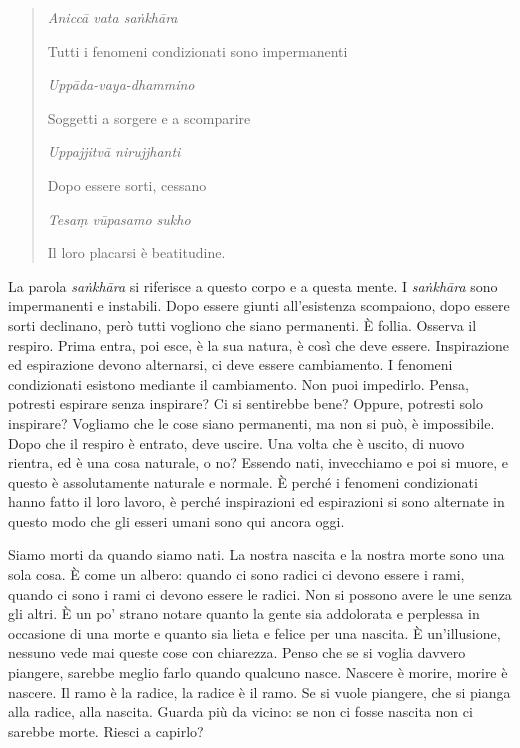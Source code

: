 \begin{quote}

\emph{Aniccā vata saṅkhāra}

Tutti i fenomeni condizionati sono impermanenti

\emph{Uppāda-vaya-dhammino}

Soggetti a sorgere e a scomparire

\emph{Uppajjitvā nirujjhanti}

Dopo essere sorti, cessano

\emph{Tesaṃ vūpasamo sukho}

Il loro placarsi è beatitudine.

\end{quote}

La parola \emph{saṅkhāra} si riferisce a questo corpo e a questa mente.
I \emph{saṅkhāra} sono impermanenti e instabili. Dopo essere giunti
all'esistenza scompaiono, dopo essere sorti declinano, però tutti
vogliono che siano permanenti. È follia. Osserva il respiro. Prima
entra, poi esce, è la sua natura, è così che deve essere. Inspirazione
ed espirazione devono alternarsi, ci deve essere cambiamento. I fenomeni
condizionati esistono mediante il cambiamento. Non puoi impedirlo.
Pensa, potresti espirare senza inspirare? Ci si sentirebbe bene? Oppure,
potresti solo inspirare? Vogliamo che le cose siano permanenti, ma non
si può, è impossibile. Dopo che il respiro è entrato, deve uscire. Una
volta che è uscito, di nuovo rientra, ed è una cosa naturale, o no?
Essendo nati, invecchiamo e poi si muore, e questo è assolutamente
naturale e normale. È perché i fenomeni condizionati hanno fatto il loro
lavoro, è perché inspirazioni ed espirazioni si sono alternate in questo
modo che gli esseri umani sono qui ancora oggi.

Siamo morti da quando siamo nati. La nostra nascita e la nostra morte
sono una sola cosa. È come un albero: quando ci sono radici ci devono
essere i rami, quando ci sono i rami ci devono essere le radici. Non si
possono avere le une senza gli altri. È un po' strano notare quanto la
gente sia addolorata e perplessa in occasione di una morte e quanto sia
lieta e felice per una nascita. È un'illusione, nessuno vede mai queste
cose con chiarezza. Penso che se si voglia davvero piangere, sarebbe
meglio farlo quando qualcuno nasce. Nascere è morire, morire è nascere.
Il ramo è la radice, la radice è il ramo. Se si vuole piangere, che si
pianga alla radice, alla nascita. Guarda più da vicino: se non ci fosse
nascita non ci sarebbe morte. Riesci a capirlo?

